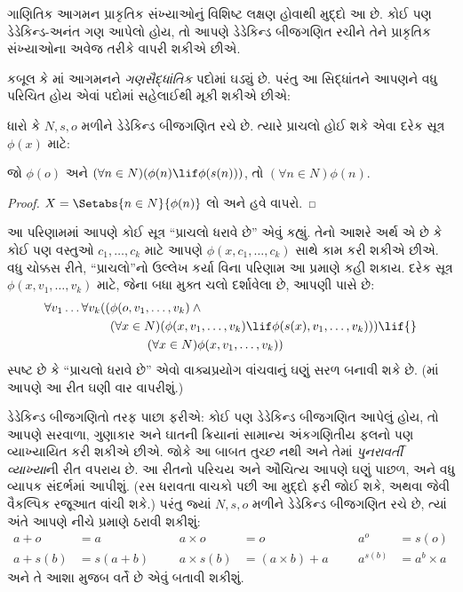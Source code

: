 ગાણિતિક આગમન પ્રાકૃતિક સંખ્યાઓનું વિશિષ્ટ લક્ષણ હોવાથી મુદ્દો આ છે.
કોઈ પણ ડેડેકિન્ડ-અનંત ગણ આપેલો હોય, તો આપણે ડેડેકિન્ડ બીજગણિત રચીને
તેને પ્રાકૃતિક સંખ્યાઓના અવેજ તરીકે વાપરી શકીએ છીએ.

કબૂલ કે માં આગમનને
\emph{ગણસૈદ્ધાંતિક} પદોમાં ઘડ્યું છે. પરંતુ આ સિદ્ધાંતને આપણને વધુ
પરિચિત હોય એવાં પદોમાં સહેલાઈથી મૂકી શકીએ છીએ:

\begin{cor}
ધારો કે $N, s, o$ મળીને ડેડેકિન્ડ બીજગણિત રચે છે. ત્યારે પ્રાચલો
હોઈ શકે એવા દરેક સૂત્ર $\phi(x)$ માટે:
\begin{center}
	જો $\phi(o)$ અને $(\forall {n} \in N)(\phi(n)\lif
	\phi({s}({n})))$, {તો} $(\forall n \in N)\phi(n)$.
\end{center}
\end{cor}

\begin{proof}
$X = \Setabs{n \in N}{\phi(n)}$ લો અને હવે
 વાપરો.
\end{proof}

આ પરિણામમાં આપણે કોઈ સૂત્ર ``પ્રાચલો ધરાવે છે'' એવું કહ્યું. તેનો
આશરે અર્થ એ છે કે કોઈ પણ વસ્તુઓ $c_1, \ldots, c_k$ માટે આપણે
$\phi(x, c_1, \ldots, c_k)$ સાથે કામ કરી શકીએ છીએ. વધુ ચોક્કસ રીતે,
``પ્રાચલો''નો ઉલ્લેખ કર્યા વિના પરિણામ આ પ્રમાણે કહી શકાય. દરેક સૂત્ર
$\phi(x, v_1, \ldots, v_k)$ માટે, જેના બધા મુક્ત ચલો દર્શાવેલા છે,
આપણી પાસે છે:
	\begin{align*}
			\forall v_1 \ldots \forall v_k((&\phi(o, v_1,\ldots, v_k) \land {}\\
			&	(\forall x \in N)(\phi(x,v_1, \ldots, v_k) \lif \phi(s(x), v_1,\ldots, v_k))) \lif {}\\
			&\hspace{3em} (\forall x \in N)\phi(x, v_1,\ldots, v_k))
	\end{align*}
સ્પષ્ટ છે કે ``પ્રાચલો ધરાવે છે'' એવો વાક્યપ્રયોગ વાંચવાનું ઘણું સરળ
બનાવી શકે છે. (માં આપણે આ રીત ઘણી વાર વાપરીશું.)

ડેડેકિન્ડ બીજગણિતો તરફ પાછા ફરીએ: કોઈ પણ ડેડેકિન્ડ બીજગણિત આપેલું
હોય, તો આપણે સરવાળા, ગુણાકાર અને ઘાતની ક્રિયાનાં સામાન્ય અંકગણિતીય
ફલનો પણ વ્યાખ્યાયિત કરી શકીએ છીએ. જોકે આ બાબત તુચ્છ નથી અને તેમાં
\emph{પુનરાવર્તી વ્યાખ્યા}ની રીત વપરાય છે. આ રીતનો પરિચય અને ઔચિત્ય
આપણે ઘણું પાછળ, અને વધુ વ્યાપક સંદર્ભમાં આપીશું. (રસ ધરાવતા વાચકો
 પછી આ મુદ્દો ફરી જોઈ શકે, અથવા
\citealt[pp.~95--8]{Potter2004} જેવી વૈકલ્પિક રજૂઆત વાંચી શકે.) પરંતુ
જ્યાં $N, s, o$ મળીને ડેડેકિન્ડ બીજગણિત રચે છે, ત્યાં અંતે આપણે નીચે
પ્રમાણે ઠરાવી શકીશું:
\begin{align*}
	{a} + {o} &= {a} & & & {a} \times {o} &= {o} & & & {a}^{o} &= s(o)\\
{a} + {s}({b}) &= {s}({a}+{b}) &&& {a} \times {s}({b}) &= ({a}\times {b}) + {a}  & & & {a}^{{s}({b})} &= {a}^{b} \times {a}
\end{align*}
અને તે આશા મુજબ વર્તે છે એવું બતાવી શકીશું.
\endgroup

